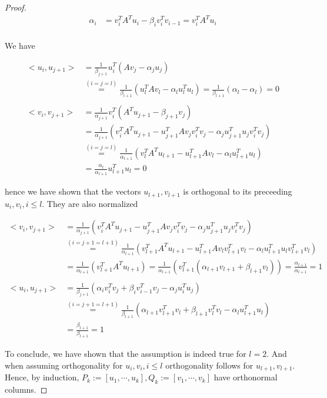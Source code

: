 \documentclass[11pt,a4paper,english]{elsarticle}%
\begin{document}
\begin{proof}
  \begin{align*}
    \alpha_i &= v_i^TA^Tu_i - \beta_i v_i^Tv_{i-1} = v_i^TA^Tu_i \\
  \end{align*}

  We have
  
  \begin{align*}
    <u_i,u_{j+1}> &= \frac{1}{\beta_{j+1}}u_i^T(Av_j - \alpha_j u_j) \\
    &\stackrel{(i = j = l)}{=} \frac{1}{\beta_{l+1}}(u_l^TAv_l - \alpha_l u_l^Tu_l)= \frac{1}{\beta_{l+1}}(\alpha_l - \alpha_l) = 0 \\
    \\
    <v_i,v_{j+1}> &= \frac{1}{\alpha_{j+1}}v_i^T(A^Tu_{j+1} - \beta_{j+1} v_j) \\
    &= \frac{1}{\alpha_{j+1}}(v_i^TA^Tu_{j+1} - u_{j+1}^TAv_jv_i^Tv_j - \alpha_ju_{j+1}^Tu_jv_i^Tv_j)\\
    &\stackrel{(i = j = l)}{=}\frac{1}{\alpha_{l+1}}(v_l^TA^Tu_{l+1} - u_{l+1}^TAv_l - \alpha_lu_{l+1}^Tu_l) \\
    &= \frac{\alpha_l}{\alpha_{l+1}}u_{l+1}^Tu_l = 0
  \end{align*}

  \noindent hence we have shown that the vectors $u_{l+1},v_{l+1}$ is orthogonal to its preceeding $u_i,v_i, i \leq l$. They are also normalized 

\begin{align*}
  <v_i,v_{j+1}> &= \frac{1}{\alpha_{j+1}}(v_i^TA^Tu_{j+1} - u_{j+1}^TAv_jv_i^Tv_j - \alpha_ju_{j+1}^Tu_jv_i^Tv_j)\\
  &\stackrel{(i = j+1 = l+1)}{=} \frac{1}{\alpha_{l+1}}(v_{l+1}^TA^Tu_{l+1} - u_{l+1}^TAv_lv_{l+1}^Tv_l - \alpha_lu_{l+1}^Tu_lv_{l+1}^Tv_l)\\
  &=\frac{1}{\alpha_{l+1}}(v_{l+1}^TA^Tu_{l+1}) =  \frac{1}{\alpha_{l+1}}(v_{l+1}^T(\alpha_{l+1}v_{l+1} + \beta_{l+1}v_l)) = \frac{\alpha_{l+1}}{\alpha_{l+1}} = 1\\
  \\
  <u_i,u_{j+1}> &= \frac{1}{\beta_{j+1}}(\alpha_iv_i^Tv_j + \beta_iv_{i-1}^Tv_j - \alpha_ju_i^Tu_j )\\
  &\stackrel{(i = j+1 = l+1)}{=} \frac{1}{\beta_{l+1}}(\alpha_{l+1}v_{l+1}^Tv_l + \beta_{l+1}v_{l}^Tv_l - \alpha_lu_{l+1}^Tu_l )\\
  &= \frac{\beta_{l+1}}{\beta_{l+1}} = 1
\end{align*}

To conclude, we have shown that the assumption is indeed true for $l = 2$. And when assuming orthogonality for $u_i,v_i, i\leq l$ orthogonality follows for $u_{l+1},v_{l+1}$. Hence, by induction, $P_k := [u_1,\cdots,u_k], Q_k := [v_1,\cdots,v_k]$ have orthonormal columns. 
\end{proof}
\end{document}
